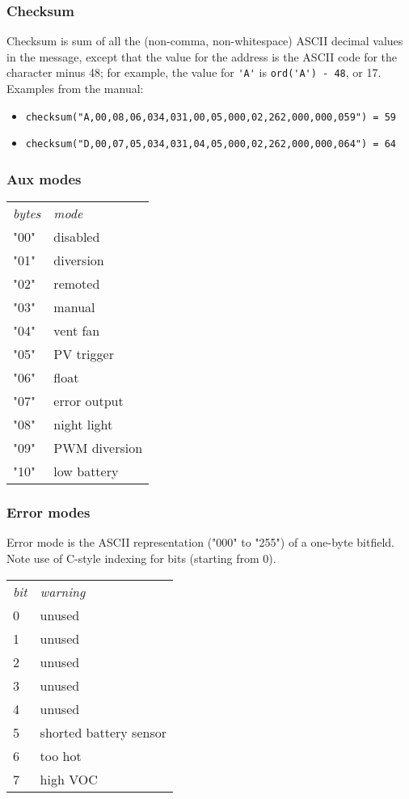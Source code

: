 \documentclass[pdftex,oneside,12pt,a4paper]{book}
\begin{document}
\subsubsection{Checksum}
Checksum is sum of all the (non-comma, non-whitespace) ASCII decimal values in the message, except that the value for the address is the ASCII code for the character minus 48; for example, the value for \verb|'A'| is \verb|ord('A') - 48|, or 17.  Examples from the manual:
\begin{itemize}
\item \verb|checksum("A,00,08,06,034,031,00,05,000,02,262,000,000,059") = 59|
\item \verb|checksum("D,00,07,05,034,031,04,05,000,02,262,000,000,064") = 64|
\end{itemize}

\subsubsection{Aux modes}
\begin{tabular}{ll}
\emph{\small bytes} & \emph{\small mode} \\
"00" & disabled \\
"01" & diversion \\
"02" & remoted\\
"03" & manual\\
"04" & vent fan\\
"05" & PV trigger\\
"06" & float\\
"07" & error output\\
"08" & night light\\
"09" & PWM diversion\\
"10" & low battery\\
\end{tabular}

\subsubsection{Error modes}
Error mode is the ASCII representation ("000" to "255") of a one-byte bitfield.  Note use of C-style indexing for bits (starting from 0).\\
\begin{tabular}{ll}
\emph{\small bit} & \emph{\small warning} \\
0 & unused \\
1 & unused \\
2 & unused \\
3 & unused\\
4 & unused\\
5 & shorted battery sensor\\
6 & too hot\\
7 & high VOC\\
\end{tabular}
\end{document}

